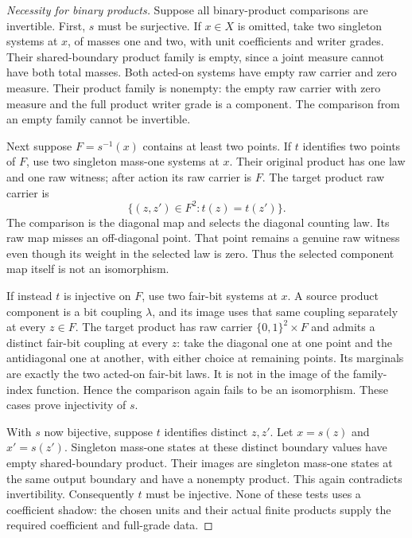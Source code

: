 \documentclass{article}
\begin{document}
\begin{proof}[Necessity for binary products]
Suppose all binary-product comparisons are invertible. First, $s$ must be
surjective. If $x\in X$ is omitted, take two singleton systems at $x$, of
masses one and two, with unit coefficients and writer grades. Their
shared-boundary product family is empty, since a joint measure cannot have
both total masses. Both acted-on systems have empty raw carrier and zero
measure. Their product family is nonempty: the empty raw carrier with zero
measure and the full product writer grade is a component. The comparison
from an empty family cannot be invertible.

Next suppose $F=s^{-1}(x)$ contains at least two points. If $t$ identifies
two points of $F$, use two singleton mass-one systems at $x$. Their original
product has one law and one raw witness; after action its raw carrier is $F$.
The target product raw carrier is
\[
 \{(z,z')\in F^2:t(z)=t(z')\}.
\]
The comparison is the diagonal map and selects the diagonal counting law.
Its raw map misses an off-diagonal point. That point remains a genuine raw
witness even though its weight in the selected law is zero. Thus the selected
component map itself is not an isomorphism.

If instead $t$ is injective on $F$, use two fair-bit systems at $x$. A source
product component is a bit coupling $\lambda$, and its image uses that same
coupling separately at every $z\in F$. The target product has raw carrier
$\{0,1\}^2\times F$ and admits a distinct fair-bit coupling at every $z$:
take the diagonal one at one point and the antidiagonal one at another, with
either choice at remaining points. Its marginals are exactly the two acted-on
fair-bit laws. It is not in the image of the family-index function. Hence the
comparison again fails to be an isomorphism. These cases prove injectivity of
$s$.

With $s$ now bijective, suppose $t$ identifies distinct $z,z'$. Let
$x=s(z)$ and $x'=s(z')$. Singleton mass-one states at these distinct boundary
values have empty shared-boundary product. Their images are singleton
mass-one states at the same output boundary and have a nonempty product.
This again contradicts invertibility. Consequently $t$ must be injective.
None of these tests uses a coefficient shadow: the chosen units and their
actual finite products supply the required coefficient and full-grade data.
\end{proof}
\end{document}
